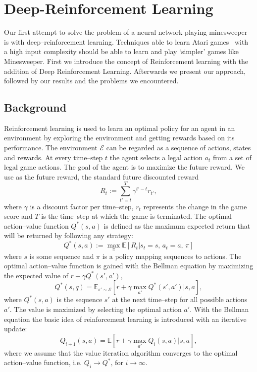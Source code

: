 \chapter{Deep-Reinforcement Learning}
Our first attempt to solve the problem of a neural network playing minesweeper is with deep--reinforcement learning.
Techniques able to learn Atari games~\cite{mnih2013playing} with a high input complexity should be able to learn and play `simpler' games like Minesweeper.
First we introduce the concept of Reinforcement learning with the addition of Deep Reinforcement Learning.
Afterwards we present our approach, followed by our results and the problems we encountered.

\section{Background}
Reinforcement learning is used to learn an optimal policy for an agent in an environment by exploring the environment and getting rewards based on its performance.
The environment $\mathcal{E}$ can be regarded as a sequence of actions, states and rewards.
At every time--step $t$ the agent selects a legal action $a_t$ from a set of legal game actions. 
The goal of the agent is to maximize the future reward.
We use as the future reward, the standard future discounted reward
\begin{equation}
R_t := \sum_{t'=t}^T \gamma^{t'-t}r_{t'},
\end{equation}
where $\gamma$ is a discount factor per time--step, $r_t$ represents the change in the game score and $T$ is the time--step at which the game is terminated.
The optimal action--value function $Q^*\left(s,a\right)$ is defined as the maximum expected return that will be returned by following any strategy:
\begin{equation}
Q^*\left(s,a\right):= \max_\pi \mathbb{E} \left[ R_t|s_t=s\text{, }a_t=a\text{, } \pi\right]
\end{equation}
where $s$ is some sequence and $\pi$ is a policy mapping sequences to actions.
The optimal action--value function is gained with the Bellman equation by maximizing the expected value of $r+\gamma Q^*\left(s',a'\right),$
\begin{equation}
Q^*\left(s,q\right)= \mathbb{E}_{s' \sim \mathcal{E}} \left[ r + \gamma \max_{a'} Q^*\left(s',a'\right)| s,a \right],
\end{equation}
where $Q^*\left(s,a\right)$ is the sequence $s'$ at the next time--step for all possible actions $a'$. 
The value is maximized by selecting the optimal action $a'$.
With the Bellman equation the basic idea of reinforcement learning is introduced with an iterative update:
\begin{equation}
Q_{i+1}\left(s,a\right)= \mathbb{E}\left[r+\gamma \max_{a'} Q_i\left(s,a\right)| s,a\right],
\end{equation} 
where we assume that the value iteration algorithm converges to the optimal action--value function, i.e. $Q_i \rightarrow Q^*\text{, for } i \rightarrow \infty$.


